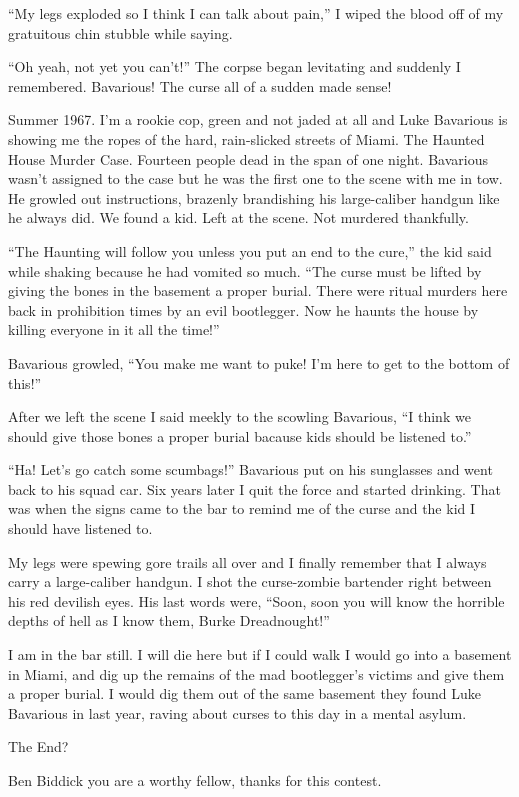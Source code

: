 ``My legs exploded so I think I can talk about pain,'' I wiped the
blood off of my gratuitous chin stubble while saying.



``Oh yeah, not yet you can't!'' The corpse began levitating and
suddenly I remembered. Bavarious! The curse all of a sudden made
sense!



Summer 1967. I'm a rookie cop, green and not jaded at all and Luke
Bavarious is showing me the ropes of the hard, rain-slicked streets
of Miami. The Haunted House Murder Case. Fourteen people dead in
the span of one night. Bavarious wasn't assigned to the case but he
was the first one to the scene with me in tow. He growled out
instructions, brazenly brandishing his large-caliber handgun like
he always did. We found a kid. Left at the scene. Not murdered
thankfully.



``The Haunting will follow you unless you put an end to the cure,''
the kid said while shaking because he had vomited so much. ``The
curse must be lifted by giving the bones in the basement a proper
burial. There were ritual murders here back in prohibition times by
an evil bootlegger. Now he haunts the house by killing everyone in
it all the time!''



Bavarious growled, ``You make me want to puke! I'm here to get to
the bottom of this!''



After we left the scene I said meekly to the scowling Bavarious, ``I
think we should give those bones a proper burial bacause kids
should be listened to.''



``Ha! Let's go catch some scumbags!'' Bavarious put on his sunglasses
and went back to his squad car. Six years later I quit the force
and started drinking. That was when the signs came to the bar to
remind me of the curse and the kid I should have listened to.



My legs were spewing gore trails all over and I finally remember
that I always carry a large-caliber handgun. I shot the
curse-zombie bartender right between his red devilish eyes. His
last words were, ``Soon, soon you will know the horrible depths of
hell as I know them, Burke Dreadnought!''



I am in the bar still. I will die here but if I could walk I would
go into a basement in Miami, and dig up the remains of the mad
bootlegger's victims and give them a proper burial. I would dig
them out of the same basement they found Luke Bavarious in last
year, raving about curses to this day in a mental asylum.



The End?





Ben Biddick you are a worthy fellow, thanks for this contest. 

 



